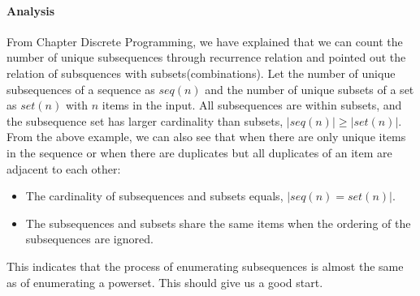 \documentclass[../main.tex]{subfiles}
\begin{document}
\paragraph{Analysis} From Chapter Discrete Programming, we have explained that we can count the number of unique subsequences through recurrence relation and pointed out the relation of subsquences with subsets(combinations). Let the number of unique subsequences of a sequence as $seq(n)$ and the number of unique subsets of a set as $set(n)$ with $n$ items in the input. All subsequences are within subsets, and the subsequence set has larger cardinality than subsets, $|seq(n)|\geq |set(n)|$. From the above example, we can also see that when there are only unique items in the sequence or when there are duplicates but all duplicates of an item are adjacent to each other:
\begin{itemize}
    \item The cardinality of subsequences and subsets equals, $|seq(n)= set(n)|$.
    \item The subsequences and subsets share the same items when the ordering of the subsequences are ignored. 
\end{itemize}
This indicates that the process of enumerating subsequences is almost the same as of enumerating a powerset. This should give us a good start.
\end{document}
